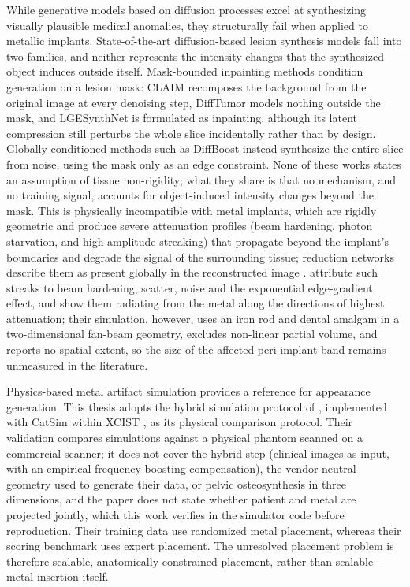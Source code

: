 \documentclass[9pt]{extarticle}
\begin{document}
While generative models based on diffusion processes excel at synthesizing visually plausible medical anomalies, they structurally fail when applied to metallic implants. State-of-the-art diffusion-based lesion synthesis models fall into two families, and neither represents the intensity changes that the synthesized object induces outside itself. Mask-bounded inpainting methods condition generation on a lesion mask: CLAIM \citep{ramzan2026claim} recomposes the background from the original image at every denoising step, DiffTumor \citep{chen2024tumorsynthesis} models nothing outside the mask, and LGESynthNet \citep{jacob2026lgesynthnet} is formulated as inpainting, although its latent compression still perturbs the whole slice incidentally rather than by design. Globally conditioned methods such as DiffBoost \citep{zhang2025diffboost} instead synthesize the entire slice from noise, using the mask only as an edge constraint. None of these works states an assumption of tissue non-rigidity; what they share is that no mechanism, and no training signal, accounts for object-induced intensity changes beyond the mask. This is physically incompatible with metal implants, which are rigidly geometric and produce severe attenuation profiles (beam hardening, photon starvation, and high-amplitude streaking) that propagate beyond the implant's boundaries and degrade the signal of the surrounding tissue; reduction networks describe them as present globally in the reconstructed image \citep{li2024}. \citet{deman1999} attribute such streaks to beam hardening, scatter, noise and the exponential edge-gradient effect, and show them radiating from the metal along the directions of highest attenuation; their simulation, however, uses an iron rod and dental amalgam in a two-dimensional fan-beam geometry, excludes non-linear partial volume, and reports no spatial extent, so the size of the affected peri-implant band remains unmeasured in the literature.

Physics-based metal artifact simulation provides a reference for appearance generation. This thesis adopts the hybrid simulation protocol of \citet{peters2025hybrid}, implemented with CatSim within XCIST \citep{deman2007catsim,wu2022xcist}, as its physical comparison protocol. Their validation compares simulations against a physical phantom scanned on a commercial scanner; it does not cover the hybrid step (clinical images as input, with an empirical frequency-boosting compensation), the vendor-neutral geometry used to generate their data, or pelvic osteosynthesis in three dimensions, and the paper does not state whether patient and metal are projected jointly, which this work verifies in the simulator code before reproduction. Their training data use randomized metal placement, whereas their scoring benchmark uses expert placement. The unresolved placement problem is therefore scalable, anatomically constrained placement, rather than scalable metal insertion itself.
\end{document}
